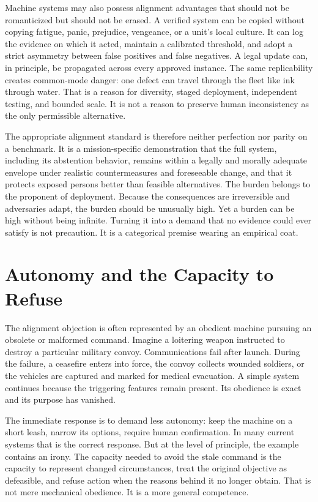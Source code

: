 \documentclass[11pt]{article}
\begin{document}
Machine systems may also possess alignment advantages that should not be romanticized but should not be erased. A verified system can be copied without copying fatigue, panic, prejudice, vengeance, or a unit's local culture. It can log the evidence on which it acted, maintain a calibrated threshold, and adopt a strict asymmetry between false positives and false negatives. A legal update can, in principle, be propagated across every approved instance. The same replicability creates common-mode danger: one defect can travel through the fleet like ink through water. That is a reason for diversity, staged deployment, independent testing, and bounded scale. It is not a reason to preserve human inconsistency as the only permissible alternative.

The appropriate alignment standard is therefore neither perfection nor parity on a benchmark. It is a mission-specific demonstration that the full system, including its abstention behavior, remains within a legally and morally adequate envelope under realistic countermeasures and foreseeable change, and that it protects exposed persons better than feasible alternatives. The burden belongs to the proponent of deployment. Because the consequences are irreversible and adversaries adapt, the burden should be unusually high. Yet a burden can be high without being infinite. Turning it into a demand that no evidence could ever satisfy is not precaution. It is a categorical premise wearing an empirical coat.

\section{Autonomy and the Capacity to Refuse}
\label{sec:refuse}

The alignment objection is often represented by an obedient machine pursuing an obsolete or malformed command. Imagine a loitering weapon instructed to destroy a particular military convoy. Communications fail after launch. During the failure, a ceasefire enters into force, the convoy collects wounded soldiers, or the vehicles are captured and marked for medical evacuation. A simple system continues because the triggering features remain present. Its obedience is exact and its purpose has vanished.

The immediate response is to demand less autonomy: keep the machine on a short leash, narrow its options, require human confirmation. In many current systems that is the correct response. But at the level of principle, the example contains an irony. The capacity needed to avoid the stale command is the capacity to represent changed circumstances, treat the original objective as defeasible, and refuse action when the reasons behind it no longer obtain. That is not mere mechanical obedience. It is a more general competence.
\end{document}
